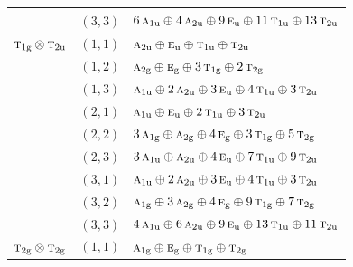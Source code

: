 \documentclass[11pt]{article}
\newcommand{\irr}[1]{\text{\normalfont\scshape #1}}
\newcommand{\ptag}[1]{\mathrm{#1}}
\begin{document}
\begin{longtable}{p{} c p{}}
 & $(3,3)$ & $6\,\irr{a}_{1\ptag{u}}\oplus 4\,\irr{a}_{2\ptag{u}}\oplus 9\,\irr{e}_{\ptag{u}}\oplus 11\,\irr{t}_{1\ptag{u}}\oplus 13\,\irr{t}_{2\ptag{u}}$\\

\hline

$\irr{t}_{1\ptag{g}}\otimes \irr{t}_{2\ptag{u}}$ & $(1,1)$ & $\irr{a}_{2\ptag{u}}\oplus \irr{e}_{\ptag{u}}\oplus \irr{t}_{1\ptag{u}}\oplus \irr{t}_{2\ptag{u}}$\\

 & $(1,2)$ & $\irr{a}_{2\ptag{g}}\oplus \irr{e}_{\ptag{g}}\oplus 3\,\irr{t}_{1\ptag{g}}\oplus 2\,\irr{t}_{2\ptag{g}}$\\

 & $(1,3)$ & $\irr{a}_{1\ptag{u}}\oplus 2\,\irr{a}_{2\ptag{u}}\oplus 3\,\irr{e}_{\ptag{u}}\oplus 4\,\irr{t}_{1\ptag{u}}\oplus 3\,\irr{t}_{2\ptag{u}}$\\

 & $(2,1)$ & $\irr{a}_{1\ptag{u}}\oplus \irr{e}_{\ptag{u}}\oplus 2\,\irr{t}_{1\ptag{u}}\oplus 3\,\irr{t}_{2\ptag{u}}$\\

 & $(2,2)$ & $3\,\irr{a}_{1\ptag{g}}\oplus \irr{a}_{2\ptag{g}}\oplus 4\,\irr{e}_{\ptag{g}}\oplus 3\,\irr{t}_{1\ptag{g}}\oplus 5\,\irr{t}_{2\ptag{g}}$\\

 & $(2,3)$ & $3\,\irr{a}_{1\ptag{u}}\oplus \irr{a}_{2\ptag{u}}\oplus 4\,\irr{e}_{\ptag{u}}\oplus 7\,\irr{t}_{1\ptag{u}}\oplus 9\,\irr{t}_{2\ptag{u}}$\\

 & $(3,1)$ & $\irr{a}_{1\ptag{u}}\oplus 2\,\irr{a}_{2\ptag{u}}\oplus 3\,\irr{e}_{\ptag{u}}\oplus 4\,\irr{t}_{1\ptag{u}}\oplus 3\,\irr{t}_{2\ptag{u}}$\\

 & $(3,2)$ & $\irr{a}_{1\ptag{g}}\oplus 3\,\irr{a}_{2\ptag{g}}\oplus 4\,\irr{e}_{\ptag{g}}\oplus 9\,\irr{t}_{1\ptag{g}}\oplus 7\,\irr{t}_{2\ptag{g}}$\\

 & $(3,3)$ & $4\,\irr{a}_{1\ptag{u}}\oplus 6\,\irr{a}_{2\ptag{u}}\oplus 9\,\irr{e}_{\ptag{u}}\oplus 13\,\irr{t}_{1\ptag{u}}\oplus 11\,\irr{t}_{2\ptag{u}}$\\

\hline

$\irr{t}_{2\ptag{g}}\otimes \irr{t}_{2\ptag{g}}$ & $(1,1)$ & $\irr{a}_{1\ptag{g}}\oplus \irr{e}_{\ptag{g}}\oplus \irr{t}_{1\ptag{g}}\oplus \irr{t}_{2\ptag{g}}$\\


\end{longtable}
\end{document}
